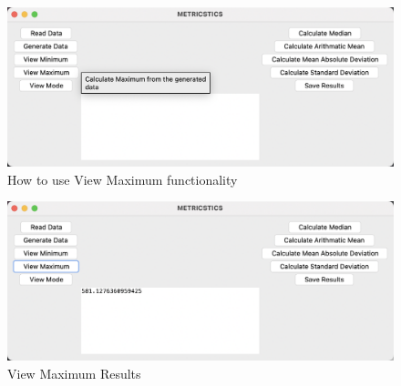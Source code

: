 \documentclass{article}
\begin{document}
\begin{enumerate}
    \begin{figure}[h]
        \centering
        \includegraphics[width=0.9\linewidth]{ViewMaximum.png}
        \caption{How to use View Maximum functionality}
    \end{figure}
    \vspace{20em}
    \begin{figure}[h]
        \centering
        \includegraphics[width=0.9\linewidth]{ViewMaximumResult.png}
        \caption{View Maximum Results}
    \end{figure}


\end{enumerate}
\end{document}
